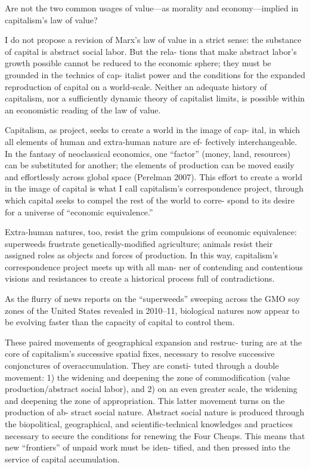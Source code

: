 \documentclass[
]{book}
\begin{document}
Are not the two common
usages of value---as morality and economy---implied in capitalism's
law of value?

I do not propose a revision of Marx's law of value in a strict
sense: the substance of capital is abstract social labor. But the rela-
tions that make abstract labor's growth possible cannot be reduced
to the economic sphere; they must be grounded in the technics of cap-
italist power and the conditions for the expanded reproduction of
capital on a world-scale. Neither an adequate history of capitalism,
nor a sufficiently dynamic theory of capitalist limits, is possible within
an economistic reading of the law of value.

Capitalism, as project, seeks to create a world in the image of cap-
ital, in which all elements of human and extra-human nature are ef-
fectively interchangeable. In the fantasy of neoclassical economics,
one ``factor'' (money, land, resources) can be substituted for another;
the elements of production can be moved easily and effortlessly
across global space (Perelman 2007). This effort to create a world in
the image of capital is what I call capitalism's correspondence project,
through which capital seeks to compel the rest of the world to corre-
spond to its desire for a universe of ``economic equivalence.''

Extra-human natures, too, resist the grim compulsions of economic
equivalence: superweeds frustrate genetically-modified agriculture;
animals resist their assigned roles as objects and forces of production.
In this way, capitalism's correspondence project meets up with all man-
ner of contending and contentious visions and resistances to create
a historical process full of contradictions.

As the flurry of news reports on the ``superweeds'' sweeping across the
GMO soy zones of the United States revealed in 2010--11, biological
natures now appear to be evolving faster than the capacity of capital
to control them.

These paired movements of geographical expansion and restruc-
turing are at the core of capitalism's successive spatial fixes, necessary
to resolve successive conjonctures of overaccumulation. They are consti-
tuted through a double movement: 1) the widening and deepening
the zone of commodification (value production/abstract social labor),
and 2) on an even greater scale, the widening and deepening the zone
of appropriation. This latter movement turns on the production of ab-
stract social nature. Abstract social nature is produced through the
biopolitical, geographical, and scientific-technical knowledges and
practices necessary to secure the conditions for renewing the Four
Cheaps. This means that new ``frontiers'' of unpaid work must be iden-
tified, and then pressed into the service of capital accumulation.
\end{document}
